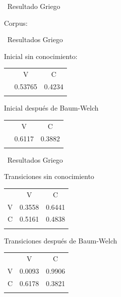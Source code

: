 \documentclass[ignorenonframetext,]{beamer}
\begin{document}
\begin{frame}{~Resultado Griego}

Corpus:

\end{frame}

\begin{frame}{~Resultados Griego}

Inicial sin conocimiento:

\begin{longtable}[c]{@{}ccc@{}}
\toprule\addlinespace
& V & C
\\\addlinespace
\midrule\endhead
& 0.53765 & 0.4234
\\\addlinespace
\bottomrule
\end{longtable}

Inicial después de Baum-Welch

\begin{longtable}[c]{@{}ccc@{}}
\toprule\addlinespace
& V & C
\\\addlinespace
\midrule\endhead
& 0.6117 & 0.3882
\\\addlinespace
\bottomrule
\end{longtable}

\end{frame}

\begin{frame}{~Resultados Griego}

Transiciones sin conocimiento

\begin{longtable}[c]{@{}ccc@{}}
\toprule\addlinespace
& V & C
\\\addlinespace
\midrule\endhead
V & 0.3558 & 0.6441
\\\addlinespace
C & 0.5161 & 0.4838
\\\addlinespace
\bottomrule
\end{longtable}

Transiciones después de Baum-Welch

\begin{longtable}[c]{@{}ccc@{}}
\toprule\addlinespace
& V & C
\\\addlinespace
\midrule\endhead
V & 0.0093 & 0.9906
\\\addlinespace
C & 0.6178 & 0.3821
\\\addlinespace
\bottomrule
\end{longtable}

\end{frame}
\end{document}

